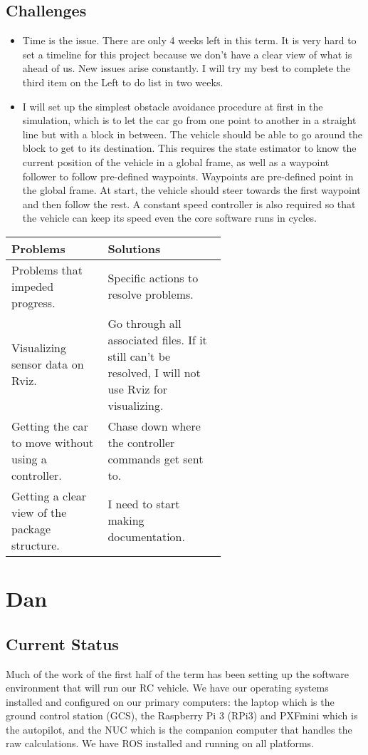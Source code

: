 \documentclass[compsoc,draftclsnofoot,onecolumn,10pt]{IEEEtran}
\begin{document}
\subsection{Challenges}
	\begin{itemize}
		\item Time is the issue. There are only 4 weeks left in this term. It is very hard to set a timeline for this project because we don't have a clear view of what is ahead of us. New issues arise constantly. I will try my best to complete the third item on the Left to do list in two weeks.
		\item I will set up the simplest obstacle avoidance procedure at first in the simulation, which is to let the car go from one point to another in a straight line but with a block in between. The vehicle should be able to go around the block to get to its destination. This requires the state estimator to know the current position of the vehicle in a global frame, as well as a waypoint follower to follow pre-defined waypoints. Waypoints are pre-defined point in the global frame. At start, the vehicle should steer towards the first waypoint and then follow the rest. A constant speed controller is also required so that the vehicle can keep its speed even the core software runs in cycles.   
	\end{itemize}
\begin{tabular}{|p{0.3\linewidth}|p{0.3\linewidth}|}
	\hline
	\textbf{Problems} & \textbf{Solutions}\\
	\hline
	Problems that impeded progress. & Specific actions to resolve problems.\\
	\hline
	Visualizing sensor data on Rviz. & Go through all associated files. If it still can't be resolved, I will not use Rviz for visualizing. \\
	\hline
	Getting the car to move without using a controller. & Chase down where the controller commands get sent to. \\
	\hline
	Getting a clear view of the package structure. & I need to start making documentation. \\
	\hline
\end{tabular}

\section{Dan}
\subsection{Current Status}
Much of the work of the first half of the term has been setting up the software environment that will run our RC vehicle.
We have our operating systems installed and configured on our primary computers: the laptop which is the ground control station (GCS), the Raspberry Pi 3 (RPi3) and PXFmini which is the autopilot, and the NUC which is the companion computer that handles the raw calculations. We have ROS installed and running on all platforms.\par
\end{document}
